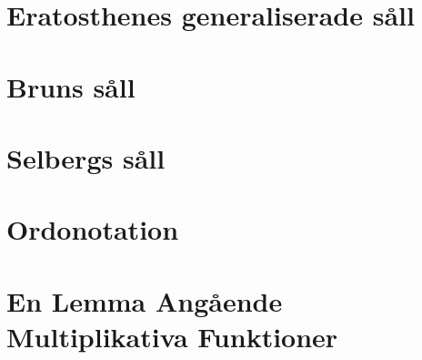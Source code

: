 \documentclass[a4paper]{article}
\begin{document}
\section{Eratosthenes generaliserade såll} \label{Eratosthenes}


\section{Bruns såll} \label{brun}


\section{Selbergs såll} \label{Selberg}


%


\medskip

\newpage
\appendix
\section{Ordonotation}

\section{En Lemma Angående Multiplikativa Funktioner}
% 

\newpage
\printbibliography
\end{document}

